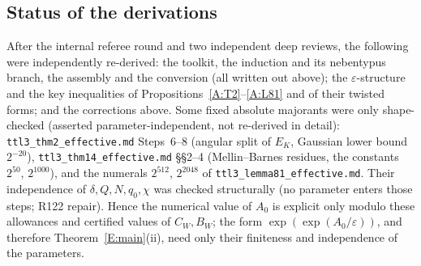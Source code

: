 \documentclass[10pt,reqno]{amsart}
\theoremstyle{definition}
\numberwithin{equation}{section}
\begin{document}
\subsection{Status of the derivations}
After the internal referee round \cite[referee reports]{TTL3} and two
independent deep reviews, the following were independently re-derived:
the toolkit, the induction and its nebentypus branch, the assembly and the
conversion (all written out above); the $\varepsilon$-structure and the key
inequalities of Propositions~\ref{A:T2}--\ref{A:L81} and of their twisted
forms; and the corrections above. Some fixed absolute majorants were only
shape-checked (asserted parameter-independent, not re-derived in detail):
\nolinkurl{ttl3_thm2_effective.md} Steps~6--8 (angular split of $E_K$,
Gaussian lower bound $2^{-20}$), \nolinkurl{ttl3_thm14_effective.md} \S\S2--4
(Mellin--Barnes residues, the constants $2^{50}$, $2^{1000}$), and the numerals
$2^{512}$, $2^{2048}$ of \nolinkurl{ttl3_lemma81_effective.md}. Their independence of $\delta,Q,N,q_0,\chi$ was checked structurally (no
parameter enters those steps; R122 repair). Hence the numerical
value of $A_0$ is explicit only modulo these allowances and certified values
of $C_W,B_W$; the form $\exp(\exp(A_0/\varepsilon))$, and therefore
Theorem~\ref{E:main}(ii), need only their finiteness and independence of the
parameters.
\end{document}
